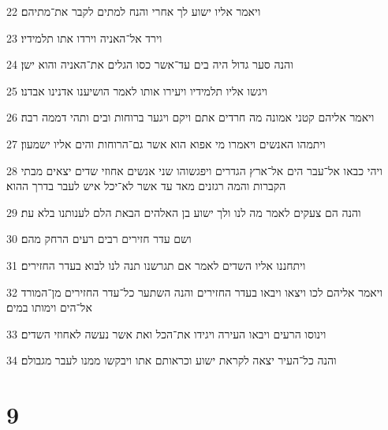 \par 22 ויאמר אליו ישוע לך אחרי והנח למתים לקבר את־מתיהם׃
\par 23 וירד אל־האניה וירדו אתו תלמידיו׃
\par 24 והנה סער גדול היה בים עד־אשר כסו הגלים את־האניה והוא ישן׃
\par 25 ויגשו אליו תלמידיו ויעירו אותו לאמר הושיענו אדנינו אבדנו׃
\par 26 ויאמר אליהם קטני אמונה מה חרדים אתם ויקם ויגער ברוחות ובים ותהי דממה רבה׃
\par 27 ויתמהו האנשים ויאמרו מי אפוא הוא אשר גם־הרוחות והים אליו ישמעון׃
\par 28 ויהי כבאו אל־עבר הים אל־ארץ הגדרים ויפגשוהו שני אנשים אחוזי שדים יצאים מבתי הקברות והמה רגזנים מאד עד אשר לא־יכל איש לעבר בדרך ההוא׃
\par 29 והנה הם צעקים לאמר מה לנו ולך ישוע בן האלהים הבאת הלם לענותנו בלא עת׃
\par 30 ושם עדר חזירים רבים רעים הרחק מהם׃
\par 31 ויתחננו אליו השדים לאמר אם תגרשנו תנה לנו לבוא בעדר החזירים׃
\par 32 ויאמר אליהם לכו ויצאו ויבאו בעדר החזירים והנה השתער כל־עדר החזירים מן־המורד אל־הים וימותו במים׃
\par 33 וינוסו הרעים ויבאו העירה ויגידו את־הכל ואת אשר נעשה לאחוזי השדים׃
\par 34 והנה כל־העיר יצאה לקראת ישוע וכראותם אתו ויבקשו ממנו לעבר מגבולם׃

\chapter{9}

